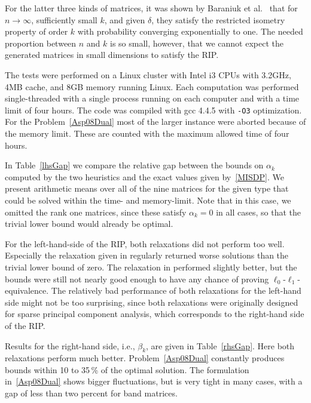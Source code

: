 \documentclass[journal]{IEEEtran}
\begin{document}
For the latter three kinds of matrices, it was shown by Baraniuk et al.~\cite{BDDW08} that for $n \rightarrow \infty$, 
sufficiently small $k$, and given $\delta$, they satisfy the restricted isometry property of order $k$  
with probability converging exponentially to one. The needed proportion between $n$ and $k$ is so small, however,
that we cannot expect the generated matrices in small dimensions to satisfy the RIP.

The tests were performed on a Linux cluster with Intel i3 CPUs with 3.2GHz, 4MB cache, and 8GB memory running
Linux. Each computation was performed single-threaded with a single process running on each computer and with 
a time limit of four hours. The code was compiled with gcc 4.4.5 with \texttt{-O3} optimization. For the 
Problem~\eqref{Asp08Dual} most of the larger instance were aborted because of the memory limit. These are
counted with the maximum allowed time of four hours. 

In Table~\ref{lhsGap} we compare the relative gap between the bounds on $\alpha_k$ computed by the two heuristics
and the exact values given by~\eqref{MISDP}. We present arithmetic means over all of the nine matrices for the given type that
could be solved within the time- and memory-limit. Note that in this case, we omitted the rank one matrices, since these satisfy
$\alpha_k = 0$ in all cases, so that the trivial lower bound would already
be optimal.

For the left-hand-side of the RIP, both relaxations did not perform
too well. Especially the relaxation given in \cite{Asp08} regularly returned worse solutions than the
trivial lower bound of zero. The relaxation in \cite{Asp07} performed slightly better, but the bounds
were still not nearly good enough to have any chance of proving $\ell_0$-$\ell_1$-equivalence. The relatively
bad performance of both relaxations for the left-hand side might not be too surprising, since both relaxations
were originally designed for sparse principal component analysis, which corresponds to the right-hand side
of the RIP.



Results for the right-hand side, i.e., $\beta_k$, are given in Table~\ref{rhsGap}. Here both relaxations
perform much better. Problem~\eqref{Asp08Dual} constantly produces bounds within 10 to 35\,\% of the optimal
solution. The formulation in~\eqref{Asp08Dual} shows bigger fluctuations, but is very tight in many cases,
with a gap of less than two percent for band matrices.
\end{document}
